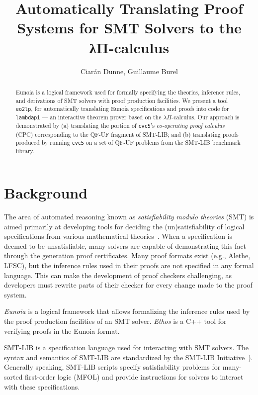 \documentclass{llncs}
\title{%
  Automatically Translating Proof Systems
  for SMT Solvers to the λΠ-calculus}
\author{Ciarán Dunne, Guillaume Burel}
\institute{INRIA, ENS Paris-Saclay}
\begin{document}
\maketitle

\begin{abstract}
	\noindent
	Eunoia is a logical framework used for formally specifying the
	theories, inference rules, and derivations of SMT solvers with
	proof production facilities.
	We present a tool \texttt{eo2lp}, for automatically translating Eunoia
	specifications and proofs into code for \texttt{lambdapi} ---
	an interactive theorem prover based on the $\lambda\Pi$-calculus.
	Our approach is demonstrated by
	(a) translating the portion of \texttt{cvc5}'s
	\textit{co-operating proof calculus} (CPC) corresponding to the QF-UF
	fragment of SMT-LIB; and
	(b) translating proofs produced by running \texttt{cvc5} on a set of
	QF-UF problems from the SMT-LIB benchmark library.
\end{abstract}

\section{Background}

The area of automated reasoning known as \emph{satisfiability modulo theories}
(SMT) is aimed primarily at developing tools for deciding the (un)satisfiability
of logical specifications from various mathematical theories~\cite{Barrett2021}.
%
When a specification is deemed to be unsatisfiable, many solvers are capable
of demonstrating this fact through the generation proof certificates.
%
Many proof formats exist (e.g., Alethe, LFSC), but the inference rules used
in their proofs are not specified in any formal language.
%
This can make the development of proof checkers challenging, as developers
must rewrite parts of their checker for every change made to the proof system.

\textit{Eunoia} is a logical framework that allows formalizing the inference
rules used by the proof production facilities of an SMT solver.
%
\textit{Ethos} is a C++ tool for verifying proofs in the Eunoia format.

SMT-LIB is a specification language used for interacting with SMT solvers.
The syntax and semantics of SMT-LIB are standardized by the
SMT-LIB Initiative~\autocite{Barrett2015-standard}).
%
Generally speaking, SMT-LIB scripts specify satisfiability problems for
many-sorted first-order logic (MFOL) and provide instructions for solvers
to interact with these specifications.
\end{document}
